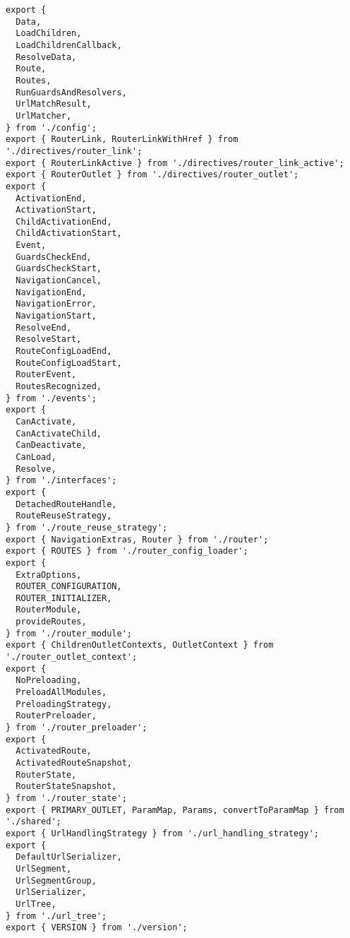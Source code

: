 \begin{verbatim}
export {
  Data,
  LoadChildren,
  LoadChildrenCallback,
  ResolveData,
  Route,
  Routes,
  RunGuardsAndResolvers,
  UrlMatchResult,
  UrlMatcher,
} from './config';
export { RouterLink, RouterLinkWithHref } from './directives/router_link';
export { RouterLinkActive } from './directives/router_link_active';
export { RouterOutlet } from './directives/router_outlet';
export {
  ActivationEnd,
  ActivationStart,
  ChildActivationEnd,
  ChildActivationStart,
  Event,
  GuardsCheckEnd,
  GuardsCheckStart,
  NavigationCancel,
  NavigationEnd,
  NavigationError,
  NavigationStart,
  ResolveEnd,
  ResolveStart,
  RouteConfigLoadEnd,
  RouteConfigLoadStart,
  RouterEvent,
  RoutesRecognized,
} from './events';
export {
  CanActivate,
  CanActivateChild,
  CanDeactivate,
  CanLoad,
  Resolve,
} from './interfaces';
export {
  DetachedRouteHandle,
  RouteReuseStrategy,
} from './route_reuse_strategy';
export { NavigationExtras, Router } from './router';
export { ROUTES } from './router_config_loader';
export {
  ExtraOptions,
  ROUTER_CONFIGURATION,
  ROUTER_INITIALIZER,
  RouterModule,
  provideRoutes,
} from './router_module';
export { ChildrenOutletContexts, OutletContext } from './router_outlet_context';
export {
  NoPreloading,
  PreloadAllModules,
  PreloadingStrategy,
  RouterPreloader,
} from './router_preloader';
export {
  ActivatedRoute,
  ActivatedRouteSnapshot,
  RouterState,
  RouterStateSnapshot,
} from './router_state';
export { PRIMARY_OUTLET, ParamMap, Params, convertToParamMap } from './shared';
export { UrlHandlingStrategy } from './url_handling_strategy';
export {
  DefaultUrlSerializer,
  UrlSegment,
  UrlSegmentGroup,
  UrlSerializer,
  UrlTree,
} from './url_tree';
export { VERSION } from './version';
\end{verbatim}
